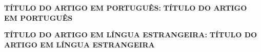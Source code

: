 \newcommand{\TITULOP}{TÍTULO DO ARTIGO EM PORTUGUÊS}
\newcommand{\TITULOE}{TÍTULO DO ARTIGO EM LÍNGUA ESTRANGEIRA}

\begin{onehalfspace}
  \begin{center}
    \ifdefined\SUBTITULOP
      \textbf{\TITULOP: \SUBTITULOP}
    \else
      \textbf{\TITULOP}
    \fi

    \ifdefined\SUBTITULOE
      \textbf{\TITULOE: \SUBTITULOE}
    \else
      \textbf{\TITULOE}
    \fi
  \end{center}
\end{onehalfspace}
